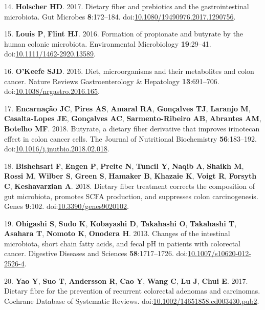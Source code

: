\documentclass[11pt,]{article}
\begin{document}
\hypertarget{ref-Holscher2017}{}
14. \textbf{Holscher HD}. 2017. Dietary fiber and prebiotics and the
gastrointestinal microbiota. Gut Microbes \textbf{8}:172--184.
doi:\href{https://doi.org/10.1080/19490976.2017.1290756}{10.1080/19490976.2017.1290756}.

\hypertarget{ref-Louis2016}{}
15. \textbf{Louis P}, \textbf{Flint HJ}. 2016. Formation of propionate
and butyrate by the human colonic microbiota. Environmental Microbiology
\textbf{19}:29--41.
doi:\href{https://doi.org/10.1111/1462-2920.13589}{10.1111/1462-2920.13589}.

\hypertarget{ref-test_OKeefe2016}{}
16. \textbf{O'Keefe SJD}. 2016. Diet, microorganisms and their
metabolites and colon cancer. Nature Reviews Gastroenterology \&
Hepatology \textbf{13}:691--706.
doi:\href{https://doi.org/10.1038/nrgastro.2016.165}{10.1038/nrgastro.2016.165}.

\hypertarget{ref-Encarnao2018}{}
17. \textbf{Encarnação JC}, \textbf{Pires AS}, \textbf{Amaral RA},
\textbf{Gonçalves TJ}, \textbf{Laranjo M}, \textbf{Casalta-Lopes JE},
\textbf{Gonçalves AC}, \textbf{Sarmento-Ribeiro AB}, \textbf{Abrantes
AM}, \textbf{Botelho MF}. 2018. Butyrate, a dietary fiber derivative
that improves irinotecan effect in colon cancer cells. The Journal of
Nutritional Biochemistry \textbf{56}:183--192.
doi:\href{https://doi.org/10.1016/j.jnutbio.2018.02.018}{10.1016/j.jnutbio.2018.02.018}.

\hypertarget{ref-Bishehsari2018}{}
18. \textbf{Bishehsari F}, \textbf{Engen P}, \textbf{Preite N},
\textbf{Tuncil Y}, \textbf{Naqib A}, \textbf{Shaikh M}, \textbf{Rossi
M}, \textbf{Wilber S}, \textbf{Green S}, \textbf{Hamaker B},
\textbf{Khazaie K}, \textbf{Voigt R}, \textbf{Forsyth C},
\textbf{Keshavarzian A}. 2018. Dietary fiber treatment corrects the
composition of gut microbiota, promotes SCFA production, and suppresses
colon carcinogenesis. Genes \textbf{9}:102.
doi:\href{https://doi.org/10.3390/genes9020102}{10.3390/genes9020102}.

\hypertarget{ref-Ohigashi2013}{}
19. \textbf{Ohigashi S}, \textbf{Sudo K}, \textbf{Kobayashi D},
\textbf{Takahashi O}, \textbf{Takahashi T}, \textbf{Asahara T},
\textbf{Nomoto K}, \textbf{Onodera H}. 2013. Changes of the intestinal
microbiota, short chain fatty acids, and fecal pH in patients with
colorectal cancer. Digestive Diseases and Sciences
\textbf{58}:1717--1726.
doi:\href{https://doi.org/10.1007/s10620-012-2526-4}{10.1007/s10620-012-2526-4}.

\hypertarget{ref-Yao2017}{}
20. \textbf{Yao Y}, \textbf{Suo T}, \textbf{Andersson R}, \textbf{Cao
Y}, \textbf{Wang C}, \textbf{Lu J}, \textbf{Chui E}. 2017. Dietary fibre
for the prevention of recurrent colorectal adenomas and carcinomas.
Cochrane Database of Systematic Reviews.
doi:\href{https://doi.org/10.1002/14651858.cd003430.pub2}{10.1002/14651858.cd003430.pub2}.
\end{document}
